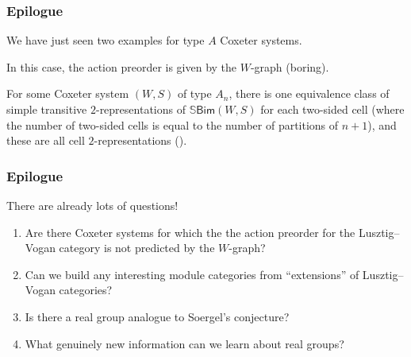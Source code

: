 \documentclass{beamer}
\newcommand{\textcat}[1]{\mathrm{\textsf{#1}}}
\begin{document}
\begin{frame}
\frametitle{Epilogue}
\noindent We have just seen two examples for type $A$ Coxeter systems.\newline

\noindent In this case, the action preorder is given by the $W$-graph (boring).\newline

\noindent For some Coxeter system $(W, S)$ of type $A_n$, there is one equivalence class of simple transitive $2$-representations of $\mathbb{S}\textcat{Bim}(W, S)$ for each two-sided cell (where the number of two-sided cells is equal to the number of partitions of $n+1$), and these are all \textcolor{structure}{cell $2$-representations} (\textcolor{structure}{\cite{MMMTZ23}}).
\end{frame}

\begin{frame}
\frametitle{Epilogue}
\noindent There are already lots of questions!\newline
\begin{addmargin}[0.5cm]{0pt}
\begin{enumerate}[]
\item Are there Coxeter systems for which the the action preorder for the Lusztig--Vogan category is not predicted by the $W$-graph?\vspace{0.25cm}\\
\item Can we build any interesting module categories from ``extensions'' of Lusztig--Vogan categories?\vspace{0.25cm}\\
\item Is there a real group analogue to Soergel's conjecture?\vspace{0.25cm}\\
\item \textcolor{structure}{What genuinely new information can we learn about real groups?}
\end{enumerate}
\end{addmargin}
\end{frame}



\end{document}
